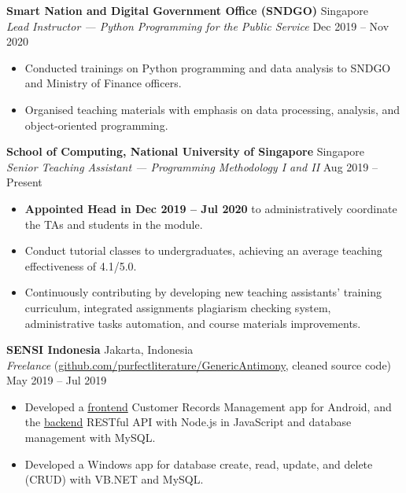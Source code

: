 \documentclass[a4paper, 11pt]{article}
\newcommand{\intraspace}{\vspace{5pt}}
\begin{document}
	\intraspace
	
	\textbf{Smart Nation and Digital Government Office (SNDGO)} \hfill Singapore\\
	\textit{Lead Instructor --- Python Programming for the Public Service} \hfill Dec 2019 -- Nov 2020 
	\begin{itemize}[leftmargin=*, noitemsep, topsep=0pt]
		\item Conducted trainings on Python programming and data analysis to SNDGO and Ministry of Finance officers.
		\item Organised teaching materials with emphasis on data processing, analysis, and object-oriented programming.
	\end{itemize}
	
	\intraspace
	
	\textbf{School of Computing, National University of Singapore} \hfill Singapore\\
	\textit{Senior Teaching Assistant --- Programming Methodology I and II} \hfill Aug 2019 -- Present
	\begin{itemize}[leftmargin=*, noitemsep, topsep=0pt]
		\item \textbf{Appointed Head in Dec 2019 -- Jul 2020} to administratively coordinate the TAs and students in the module.
		\item Conduct tutorial classes to undergraduates, achieving an average teaching effectiveness of 4.1/5.0.
		\item Continuously contributing by developing new teaching assistants' training curriculum, integrated assignments plagiarism checking system, administrative tasks automation, and course materials improvements.
	\end{itemize}
	
	\intraspace
	
	\textbf{SENSI Indonesia} \hfill Jakarta, Indonesia\\
	\textit{Freelance} (\href{https://github.com/purfectliterature/GenericAntimony}{github.com/purfectliterature/GenericAntimony}, cleaned source code) \hfill May 2019 -- Jul 2019
	\begin{itemize}[leftmargin=*, noitemsep, topsep=0pt]
		\item Developed a \href{https://github.com/purfectliterature/GenericAntimony}{frontend} Customer Records Management app for Android, and the \href{https://github.com/purfectliterature/GenericAntimonyBackend}{backend} RESTful API with Node.js in JavaScript and database management with MySQL.
		\item Developed a Windows app for database create, read, update, and delete (CRUD) with VB.NET and MySQL.
	\end{itemize}
	
\end{document}
